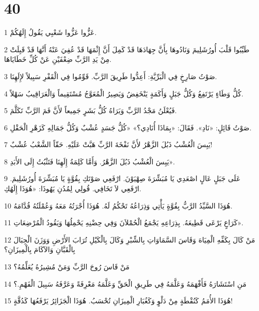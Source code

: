 \chapter{40}

\par 1 عَزُّوا عَزُّوا شَعْبِي يَقُولُ إِلَهُكُمْ.
\par 2 طَيِّبُوا قَلْبَ أُورُشَلِيمَ وَنَادُوهَا بِأَنَّ جِهَادَهَا قَدْ كَمِلَ أَنَّ إِثْمَهَا قَدْ عُفِيَ عَنْهُ أَنَّهَا قَدْ قَبِلَتْ مِنْ يَدِ الرَّبِّ ضِعْفَيْنِ عَنْ كُلِّ خَطَايَاهَا.
\par 3 صَوْتُ صَارِخٍ فِي الْبَرِّيَّةِ: أَعِدُّوا طَرِيقَ الرَّبِّ. قَوِّمُوا فِي الْقَفْرِ سَبِيلاً لإِلَهِنَا.
\par 4 كُلُّ وَطَاءٍ يَرْتَفِعُ وَكُلُّ جَبَلٍ وَأَكَمَةٍ يَنْخَفِضُ وَيَصِيرُ الْمُعَوَّجُ مُسْتَقِيماً وَالْعَرَاقِيبُ سَهْلاً.
\par 5 فَيُعْلَنُ مَجْدُ الرَّبِّ وَيَرَاهُ كُلُّ بَشَرٍ جَمِيعاً لأَنَّ فَمَ الرَّبِّ تَكَلَّمَ.
\par 6 صَوْتُ قَائِلٍ: «نَادِ». فَقَالَ: «بِمَاذَا أُنَادِي؟» «كُلُّ جَسَدٍ عُشْبٌ وَكُلُّ جَمَالِهِ كَزَهْرِ الْحَقْلِ.
\par 7 يَبِسَ الْعُشْبُ ذَبُلَ الزَّهْرُ لأَنَّ نَفْخَةَ الرَّبِّ هَبَّتْ عَلَيْهِ. حَقّاً الشَّعْبُ عُشْبٌ!
\par 8 يَبِسَ الْعُشْبُ ذَبُلَ الزَّهْرُ. وَأَمَّا كَلِمَةُ إِلَهِنَا فَتَثْبُتُ إِلَى الأَبَدِ».
\par 9 عَلَى جَبَلٍ عَالٍ اصْعَدِي يَا مُبَشِّرَةَ صِهْيَوْنَ. ارْفَعِي صَوْتَكِ بِقُوَّةٍ يَا مُبَشِّرَةَ أُورُشَلِيمَ. ارْفَعِي لاَ تَخَافِي. قُولِي لِمُدُنِ يَهُوذَا: «هُوَذَا إِلَهُكِ.
\par 10 هُوَذَا السَّيِّدُ الرَّبُّ بِقُوَّةٍ يَأْتِي وَذِرَاعُهُ تَحْكُمُ لَهُ. هُوَذَا أُجْرَتُهُ مَعَهُ وَعُمْلَتُهُ قُدَّامَهُ.
\par 11 كَرَاعٍ يَرْعَى قَطِيعَهُ. بِذِرَاعِهِ يَجْمَعُ الْحُمْلاَنَ وَفِي حِضْنِهِ يَحْمِلُهَا وَيَقُودُ الْمُرْضِعَاتِ».
\par 12 مَنْ كَالَ بِكَفِّهِ الْمِيَاهَ وَقَاسَ السَّمَاوَاتِ بِالشِّبْرِ وَكَالَ بِالْكَيْلِ تُرَابَ الأَرْضِ وَوَزَنَ الْجِبَالَ بِالْقَبَّانِ وَالآكَامَ بِالْمِيزَانِ؟
\par 13 مَنْ قَاسَ رُوحَ الرَّبِّ وَمَنْ مُشِيرُهُ يُعَلِّمُهُ؟
\par 14 مَنِ اسْتَشَارَهُ فَأَفْهَمَهُ وَعَلَّمَهُ فِي طَرِيقِ الْحَقِّ وَعَلَّمَهُ مَعْرِفَةً وَعَرَّفَهُ سَبِيلَ الْفَهْمِ.؟
\par 15 هُوَذَا الأُمَمُ كَنُقْطَةٍ مِنْ دَلْوٍ وَكَغُبَارِ الْمِيزَانِ تُحْسَبُ. هُوَذَا الْجَزَائِرُ يَرْفَعُهَا كَدُقَّةٍ!
